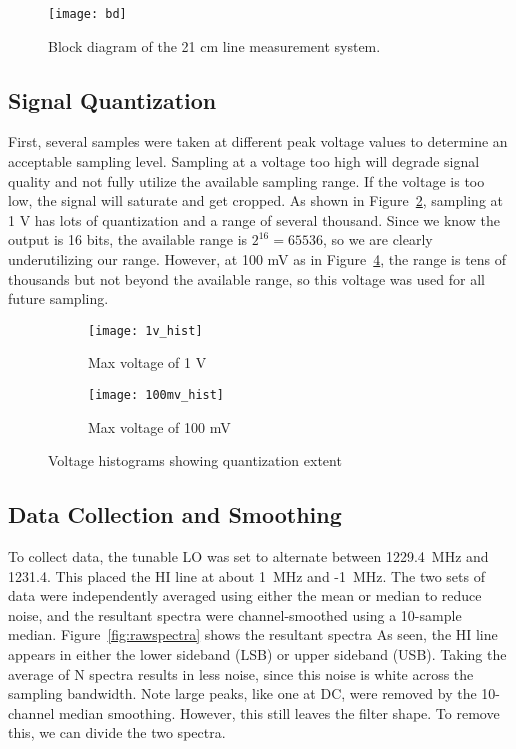 \documentclass[12pt]{article}
\begin{document}
\begin{figure}
\centering
\texttt{[image: bd]}
\caption{Block diagram of the 21 cm line measurement system.}
\label{fig:bd}
\end{figure}

\subsection{Signal Quantization}
First, several samples were taken at different peak voltage values to determine an acceptable sampling level.
Sampling at a voltage too high will degrade signal quality and not fully utilize the available sampling range.
If the voltage is too low, the signal will saturate and get cropped.
As shown in Figure~\ref{fig:1vhist}, sampling at 1 V has lots of quantization and a range of several thousand.
Since we know the output is 16 bits, the available range is $2^{16}=65536$, so we are clearly underutilizing our range.
However, at 100 mV as in Figure~\ref{fig:100mvhist}, the range is tens of thousands but not beyond the available range, so this voltage was used for all future sampling.


\begin{figure}[h]
    \centering
    \begin{subfigure}[b]{0.44\textwidth}
        \texttt{[image: 1v\_hist]}
        \caption{Max voltage of 1 V}
        \label{fig:1vhist}
    \end{subfigure}
    \quad
    \begin{subfigure}[b]{0.46\textwidth}
        \texttt{[image: 100mv\_hist]}
        \caption{Max voltage of 100 mV}
        \label{fig:100mvhist}
    \end{subfigure}
    \caption{Voltage histograms showing quantization extent}
\end{figure}

\subsection{Data Collection and Smoothing}
To collect data, the tunable LO was set to alternate between 1229.4~MHz and 1231.4.
This placed the HI line at about 1~MHz and -1~MHz.
The two sets of data were independently averaged using either the mean or median to reduce noise, and the resultant spectra were channel-smoothed using a 10-sample median.
Figure~\ref{fig:rawspectra} shows the resultant spectra
As seen, the HI line appears in either the lower sideband (LSB) or upper sideband (USB).
Taking the average of N spectra results in less noise, since this noise is white across the sampling bandwidth.
Note large peaks, like one at DC, were removed by the 10-channel median smoothing.
However, this still leaves the filter shape.
To remove this, we can divide the two spectra.
\end{document}
